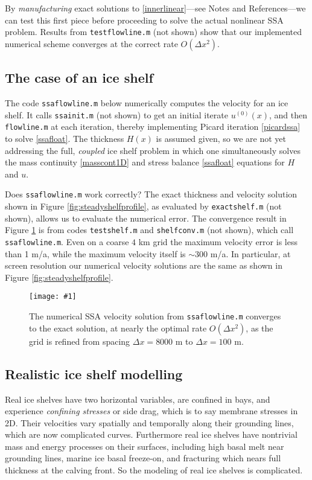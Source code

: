 \documentclass[letterpaper,final,12pt,reqno]{amsart}
\newcommand{\minput}[1]{
\vspace{0.8cm}
\VerbatimInput[frame=single,framesep=3mm,label=\fbox{\normalsize \textsl{\,#1.m\,}},fontfamily=courier,fontsize=\footnotesize]{tmp/#1.slim.m}
\vspace{0.5cm}
}
\newcommand{\onefigsize}[3]{
\begin{figure}[ht]
\centering
\texttt{[image: \#1]}
\caption{#2}
\label{fig:#1}
\end{figure}}
\newcommand{\onefig}[2]{\onefigsize{#1}{#2}{3.0in}}
\begin{document}
\minput{flowline}

By \emph{manufacturing} exact solutions to \eqref{innerlinear}---see Notes and References---we can test this first piece before proceeding to solve the actual nonlinear SSA problem.   Results from \texttt{testflowline.m} (not shown) show that our implemented numerical scheme converges at the correct rate $O(\Delta x^2)$.

\subsection*{The case of an ice shelf}  The code \texttt{ssaflowline.m} below numerically computes the velocity for an ice shelf.  It calls \texttt{ssainit.m} (not shown) to get an initial iterate $u^{(0)}(x)$, and then \texttt{flowline.m} at each iteration, thereby implementing Picard iteration \eqref{picardssa} to solve \eqref{ssafloat}.  The thickness $H(x)$ is assumed given, so we are not yet addressing the full, \emph{coupled} ice shelf problem in which one simultaneously solves the mass continuity \eqref{masscont1D} and stress balance \eqref{ssafloat} equations for $H$ and $u$.

\minput{ssaflowline}

Does \texttt{ssaflowline.m} work correctly?  The exact thickness and velocity solution shown in Figure \ref{fig:steadyshelfprofile}, as evaluated by \texttt{exactshelf.m} (not shown), allows us to evaluate the numerical error.  The convergence result in Figure \ref{fig:shelfconv} is from codes \texttt{testshelf.m} and \texttt{shelfconv.m} (not shown), which call \texttt{ssaflowline.m}.  Even on a coarse $4$ km grid the maximum velocity error is less than 1 m/a, while the maximum velocity itself is $\sim 300$ m/a.  In particular, at screen resolution our numerical velocity solutions are the same as shown in Figure \ref{fig:steadyshelfprofile}.

\onefig{shelfconv}{The numerical SSA velocity solution from \texttt{ssaflowline.m} converges to the exact solution, at nearly the optimal rate $O(\Delta x^2)$, as the grid is refined from spacing $\Delta x=8000$ m to $\Delta x=100$ m.}

\subsection*{Realistic ice shelf modelling}  Real ice shelves have two horizontal variables, are confined in bays, and experience \emph{confining stresses} or side drag, which is to say membrane stresses in 2D.  Their velocities vary spatially and temporally along their grounding lines, which are now complicated curves.  Furthermore real ice shelves have nontrivial mass and energy processes on their surfaces, including high basal melt near grounding lines, marine ice basal freeze-on, and fracturing which nears full thickness at the calving front.  So the modeling of real ice shelves is complicated.
\end{document}
